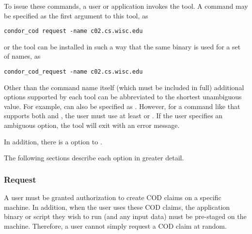 To issue these commands, a user or application invokes the 
 tool.
A command may be specified as the first argument to this tool, 
as
\begin{verbatim}
condor_cod request -name c02.cs.wisc.edu
\end{verbatim}
or
the  tool can be installed in such a way that the same
binary is used for a set of names, as
\begin{verbatim}
condor_cod_request -name c02.cs.wisc.edu
\end{verbatim}

Other than the command name itself (which must be included in full)
additional options supported by each tool can be abbreviated to the
shortest unambiguous value.
For example,  can also be specified as .
However, for a command like  that supports both
 and , the user must use at least
 or .
If the user specifies an ambiguous option, the  tool will
exit with an error message.

In addition, there is a  option to .

The following sections describe each option in greater detail.

\subsubsection{\label{sec:cod-claim-request}Request}

A user must be granted authorization to create COD
claims on a specific machine.
In addition, when the user uses these COD claims, the application
binary or script they wish to run (and any input data) must be
pre-staged on the machine.
Therefore, a user cannot simply request a COD claim at random.

